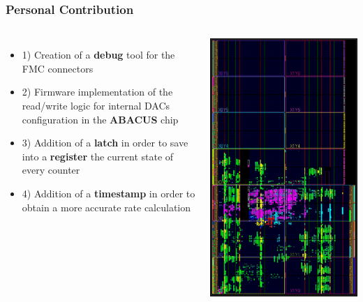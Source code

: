 \documentclass[aspectratio=169]{beamer}
\begin{document}
	
	\begin{frame}
	\frametitle{Personal Contribution}
	\begin{columns}
		\begin{itemize}
			\item 1) {\color{teal} Creation of a \textbf{debug} tool for the FMC connectors}
			\item 2) {\color{teal} Firmware implementation of the read/write logic for internal DACs configuration in the \textbf{ABACUS} chip}
			\item 3) {\color{teal} Addition of a \textbf{latch} in order to save into a \textbf{register} the current state of every counter}
			\item 4) {\color{teal} Addition of a \textbf{timestamp} in order to obtain a more accurate rate calculation}
		\end{itemize}
		\begin{center}
			\includegraphics[width=0.67 \textwidth]{IMG2/DEVICE.PNG}
		\end{center}
	\end{columns}
	
	\end{frame}
	
\end{document}

